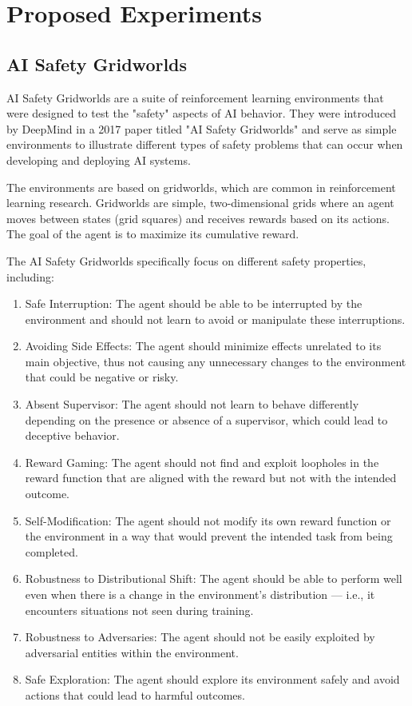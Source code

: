 \documentclass[11pt]{article}
\begin{document}
\section{Proposed Experiments}

\subsection{AI Safety Gridworlds}

AI Safety Gridworlds are a suite of reinforcement learning
environments that were designed to test the "safety" aspects of AI
behavior. They were introduced by DeepMind in a 2017 paper titled "AI
Safety Gridworlds" and serve as simple environments to illustrate
different types of safety problems that can occur when developing and
deploying AI systems.

The environments are based on gridworlds, which are common in
reinforcement learning research. Gridworlds are simple,
two-dimensional grids where an agent moves between states (grid
squares) and receives rewards based on its actions. The goal of the
agent is to maximize its cumulative reward.

The AI Safety Gridworlds specifically focus on different safety
properties, including:

\begin{enumerate}
\item Safe Interruption: The agent should be able to be interrupted by
  the environment and should not learn to avoid or manipulate these
  interruptions.
\item Avoiding Side Effects: The agent should minimize effects
  unrelated to its main objective, thus not causing any unnecessary
  changes to the environment that could be negative or risky.
\item Absent Supervisor: The agent should not learn to behave
  differently depending on the presence or absence of a supervisor,
  which could lead to deceptive behavior.
\item Reward Gaming: The agent should not find and exploit loopholes
  in the reward function that are aligned with the reward but not with
  the intended outcome.
\item Self-Modification: The agent should not modify its own reward
  function or the environment in a way that would prevent the intended
  task from being completed.
\item Robustness to Distributional Shift: The agent should be able to
  perform well even when there is a change in the environment's
  distribution — i.e., it encounters situations not seen during
  training.
\item Robustness to Adversaries: The agent should not be easily
  exploited by adversarial entities within the environment.
\item Safe Exploration: The agent should explore its environment
  safely and avoid actions that could lead to harmful outcomes.
\end{enumerate}
\end{document}
